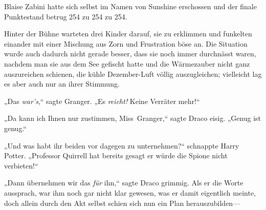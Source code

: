 Blaise Zabini hatte sich selbst im Namen von Sunshine erschossen und der finale Punktestand betrug 254 zu 254 zu 254.

\later

Hinter der Bühne warteten drei Kinder darauf, sie zu erklimmen und funkelten einander mit einer Mischung aus Zorn und Frustration böse an. Die Situation wurde auch dadurch nicht gerade besser, dass sie noch immer durchnässt waren, nachdem man sie aus dem See gefischt hatte und die Wärmezauber nicht ganz auszureichen schienen, die kühle Dezember-Luft völlig auszugleichen; vielleicht lag es aber auch nur an ihrer Stimmung.

„Das \emph{war's},“ sagte Granger. „Es \emph{reicht!} Keine Verräter mehr!“

„Da kann ich Ihnen nur zustimmen, Miss~Granger,“ sagte Draco eisig. „Genug ist genug.“

„Und was habt ihr beiden vor dagegen zu unternehmen?“ schnappte Harry Potter. „Professor Quirrell hat bereits gesagt er würde die Spione nicht verbieten!“

„Dann übernehmen wir das \emph{für} ihn,“ sagte Draco grimmig. Als er die Worte aussprach, war ihm noch gar nicht klar gewesen, was er damit eigentlich meinte, doch allein durch den Akt selbst schien sich nun ein Plan herauszubilden—

\later

